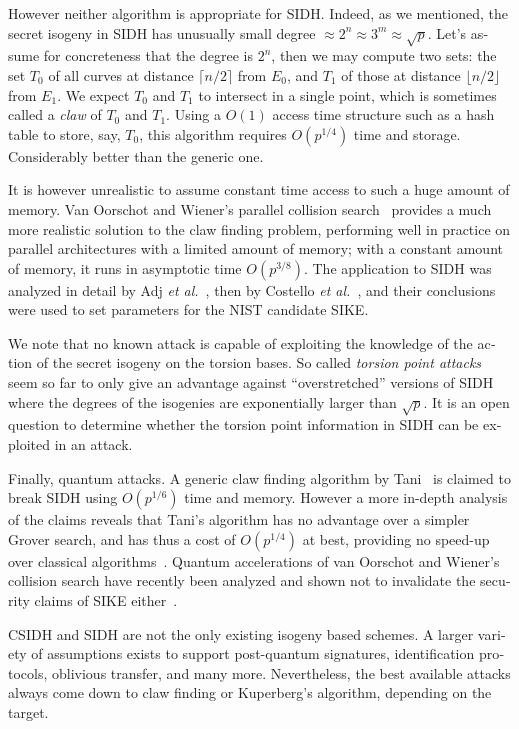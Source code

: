 \begin{otherlanguage}{english}
However neither algorithm is appropriate for SIDH. Indeed, as we
mentioned, the secret isogeny in SIDH has unusually small degree
$\approx 2^n\approx 3^m\approx \sqrt{p}$. Let's assume for
concreteness that the degree is $2^n$, then we may compute two sets:
the set $T_0$ of all curves at distance $\lceil n/2\rceil$ from $E_0$,
and $T_1$ of those at distance $\lfloor n/2\rfloor$ from $E_1$.  We
expect $T_0$ and $T_1$ to intersect in a single point, which is
sometimes called a \emph{claw} of $T_0$ and $T_1$.  Using a $O(1)$
access time structure such as a hash table to store, say, $T_0$, this
algorithm requires $O(p^{1/4})$ time and storage. Considerably better
than the generic one.

It is however unrealistic to assume constant time access to such a
huge amount of memory. Van Oorschot and Wiener's parallel collision
search~\cite{JC:VanWie99} provides a much more realistic solution to
the claw finding problem, performing well in practice on parallel
architectures with a limited amount of memory; with a constant amount
of memory, it runs in asymptotic time $O(p^{3/8})$. The application to
SIDH was analyzed in detail by Adj \emph{et al.}~\cite{SAC:ACCMR18},
then by Costello \emph{et al.}~\cite{PKC:CLNRV20}, and their
conclusions were used to set parameters for the NIST candidate SIKE.

We note that no known attack is capable of exploiting the knowledge of
the action of the secret isogeny on the torsion bases. So called
\emph{torsion point attacks}~\cite{AC:Petit17,EPRINT:KMPPS20} seem so
far to only give an advantage against ``overstretched'' versions of
SIDH where the degrees of the isogenies are exponentially larger than
$\sqrt{p}$. It is an open question to determine whether the torsion
point information in SIDH can be exploited in an attack.

Finally, quantum attacks. A generic claw finding algorithm by
Tani~\cite{tani2009claw} is claimed to break SIDH using $O(p^{1/6})$
time and memory. However a more in-depth analysis of the claims
reveals that Tani's algorithm has no advantage over a simpler Grover
search, and has thus a cost of $O(p^{1/4})$ at best, providing no
speed-up over classical algorithms~\cite{C:JaqSch19}. Quantum
accelerations of van Oorschot and Wiener's collision search have
recently been analyzed and shown not to invalidate the security claims
of SIKE either~\cite{EPRINT:JaqSch20}.

CSIDH and SIDH are not the only existing isogeny based schemes.  A
larger variety of assumptions exists to support post-quantum
signatures, identification protocols, oblivious transfer, and many
more. Nevertheless, the best available attacks always come down to
claw finding or Kuperberg's algorithm, depending on the target.


\end{otherlanguage}
